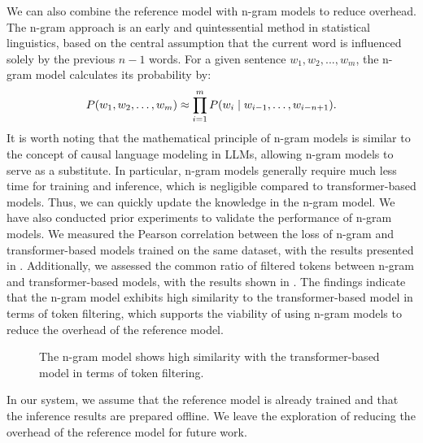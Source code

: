  We can also combine the reference model with n-gram models to reduce overhead. The n-gram approach is an early and quintessential method in statistical linguistics, based on the central assumption that the current word is influenced solely by the previous $n-1$ words. For a given sentence $w_1, w_2, ..., w_m$, the n-gram model calculates its probability by: 
\begin{equation}
	\vspace{-1mm}
    P(w_1, w_2, \dots, w_m) \approx \prod_{i=1}^{m} P(w_i \mid w_{i-1}, \dots, w_{i-n+1}).
	\vspace{-1mm}
\end{equation}
It is worth noting that the mathematical principle of n-gram models is similar to the concept of causal language modeling in LLMs, allowing n-gram models to serve as a substitute. In particular, n-gram models generally require much less time for training and inference, which is negligible compared to transformer-based models. Thus, we can quickly update the knowledge in the n-gram model.
We have also conducted prior experiments to validate the performance of n-gram models. We measured the Pearson correlation between the loss of n-gram and transformer-based models trained on the same dataset, with the results presented in . Additionally, we assessed the common ratio of filtered tokens between n-gram and transformer-based models, with the results shown in . The findings indicate that the n-gram model exhibits high similarity to the transformer-based model in terms of token filtering, which supports the viability of using n-gram models to reduce the overhead of the reference model.

\begin{figure}[t!]
	\small
	\centering
	\hfil
	\caption{The n-gram model shows high similarity with the transformer-based model in terms of token filtering.}
	\vspace{+1mm}
	\label{fig:dis:n-gram}
\end{figure}

In our system, we assume that the reference model is already trained and that the inference results are prepared offline. We leave the exploration of reducing the overhead of the reference model for future work.
